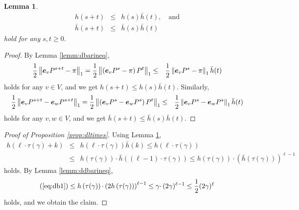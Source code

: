 \documentclass[letter, 11pt]{article}
\renewcommand{\Vec}[1]{\mbox{\boldmath $#1$}}
\newcommand{\1}{\mbox{1}\hspace{-0.25em}\mbox{l}}
\newcommand{\tmix}{\tau}
\newtheorem{lemma}[theorem]{Lemma}
\begin{document}
\begin{lemma}
\label{lemm:smp}
\begin{eqnarray*}
h(s+t) &\leq& h(s)\bar{h}(t), \quad\mbox{and}\\
\bar{h}(s+t)&\leq& \bar{h}(s)\bar{h}(t)  
\end{eqnarray*}
hold for any $s, t\geq 0$. 
\end{lemma} 
\begin{proof}
By Lemma \ref{lemm:dbarineq}, 
\begin{eqnarray*}
\frac{1}{2}\left \| \Vec e_v P^{s+t}-\pi\right\|_{1}
=\frac{1}{2}\left \| \left( \Vec e_v P^{s}-\pi \right) P^t\right\|_{1}
&\leq &\frac{1}{2}\left \| \Vec e_v P^{s}-\pi \right\|_{1}\bar{h}(t)
\end{eqnarray*}
holds for any $v\in V$, and we get $h(s+t)\leq h(s)\bar{h}(t)$. 
Similarly, 
\begin{eqnarray*}
\frac{1}{2}\left \| \Vec e_v P^{s+t}-\Vec e_w P^{s+t} \right\|_{1}
=\frac{1}{2}\left \| \left( \Vec e_v P^{s}-\Vec e_w P^{s} \right) P^t\right\|_{1}
&\leq &\frac{1}{2}\left \| \Vec e_v P^{s}-\Vec e_w P^{s} \right\|_{1}\bar{h}(t)
\end{eqnarray*}
holds for any $v, w\in V$, and we get $\bar{h}(s+t)\leq \bar{h}(s)\bar{h}(t)$. 
\end{proof}

\begin{proof}[Proof of Proposition \ref{prop:dltimes}]
Using Lemma \ref{lemm:smp}, 
\begin{eqnarray}
h\left(\ell \cdotp \tmix(\gamma )+k \right)
&\leq &h\left(\ell \cdotp \tmix(\gamma )\right){\bar h}(k)
\leq h\left(\ell \cdotp \tmix(\gamma )\right) \nonumber \\
&\leq &h\left(\tmix(\gamma )\right) \cdotp \bar{h} \left((\ell-1)\cdotp \tmix(\gamma )\right) 
\leq h\left(\tmix(\gamma )\right) \cdotp \left(\bar{h} \left(\tmix(\gamma )\right)\right)^{\ell-1}
\label{eq:db1}
\end{eqnarray}
holds. 
By Lemma \ref{lemm:ddbarineq}, 
\begin{eqnarray*}
(\ref{eq:db1})
\leq h\left(\tmix(\gamma )\right) \cdotp \left(2 h\left(\tmix(\gamma )\right)\right)^{\ell-1}
\leq \gamma \cdotp (2\gamma )^{\ell-1}
\leq \frac{1}{2}(2\gamma)^\ell
\end{eqnarray*}
holds, and we obtain the claim. 
\end{proof}
\end{document}
